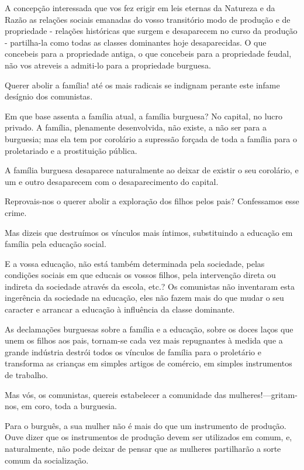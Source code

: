 A concepção interessada que vos fez erigir em leis eternas da Natureza
e da Razão as relações sociais emanadas do vosso transitório modo de
produção e de propriedade - relações históricas que surgem e
desaparecem no curso da produção - partilha-la como todas as classes
dominantes hoje desaparecidas. O que concebeis para a propriedade
antiga, o que concebeis para a propriedade feudal, não vos atreveis a
admiti-lo para a propriedade burguesa.

Querer abolir a família! até os mais radicais se indignam perante este
infame desígnio dos comunistas.

Em que base assenta a família atual, a família burguesa? No capital,
no lucro privado. A família, plenamente desenvolvida, não existe, a
não ser para a burguesia; mas ela tem por corolário a supressão
forçada de toda a família para o proletariado e a prostituição
pública.

A família burguesa desaparece naturalmente ao deixar de existir o seu
corolário, e um e outro desaparecem com o desaparecimento do capital.

Reprovais-nos o querer abolir a exploração dos filhos pelos pais?
Confessamos esse crime.

Mas dizeis que destruímos os vínculos mais íntimos, substituindo a
educação em família pela educação social.

E a vossa educação, não está também determinada pela sociedade, pelas
condições sociais em que educais os vossos filhos, pela intervenção
direta ou indireta da sociedade através da escola, etc.? Os comunistas
não inventaram esta ingerência da sociedade na educação, eles não
fazem mais do que mudar o seu caracter e arrancar a educação à
influência da classe dominante.

As declamações burguesas sobre a família e a educação, sobre os doces
laços que unem os filhos aos pais, tornam-se cada vez mais repugnantes
à medida que a grande indústria destrói todos os vínculos de família
para o proletário e transforma as crianças em simples artigos de
comércio, em simples instrumentos de trabalho.

Mas vós, os comunistas, quereis estabelecer a comunidade das
mulheres!---gritam-nos, em coro, toda a burguesia.

Para o burguês, a sua mulher não é mais do que um instrumento de
produção. Ouve dizer que os instrumentos de produção devem ser
utilizados em comum, e, naturalmente, não pode deixar de pensar que as
mulheres partilharão a sorte comum da socialização.

